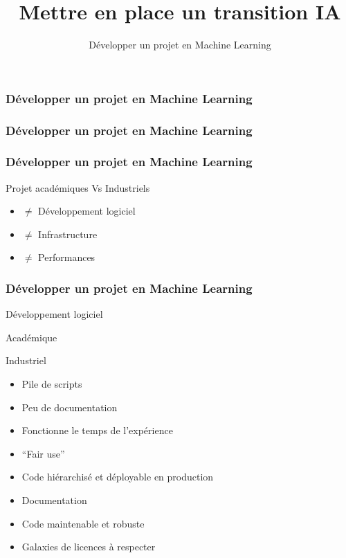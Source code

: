 \documentclass{formation}
\title{Mettre en place un transition IA}
\subtitle{Développer un projet en Machine Learning}
\begin{document}
\maketitle

\begin{frame}
  \frametitle{Développer un projet en Machine Learning}
\end{frame}

\begin{frame}
  \frametitle{Développer un projet en Machine Learning}
\end{frame}

\begin{frame}
  \frametitle{Développer un projet en Machine Learning}
  Projet académiques Vs Industriels
  \begin{itemize}
  \item $\neq$ Développement logiciel
  \item $\neq$ Infrastructure
  \item $\neq$ Performances
  \end{itemize}
\end{frame}

\begin{frame}
  \frametitle{Développer un projet en Machine Learning}
  \begin{center}
    Développement logiciel
  \end{center}
  \begin{minipage}[c]{0.49\linewidth}
    \begin{center}
      Académique
      \newline
    \end{center}
  \end{minipage}\hfill
  \begin{minipage}[c]{0.49\linewidth}
    \begin{center}
      Industriel
      \newline
    \end{center}
  \end{minipage}\hfill
  \begin{minipage}[c]{0.49\linewidth}
    \begin{itemize}
    \item Pile de scripts
    \item Peu de documentation
    \item Fonctionne le temps de l'expérience
      \item ``Fair use''
    \end{itemize}
  \end{minipage}\hfill
  \vrule{}
  \begin{minipage}[c]{0.49\linewidth}
    \begin{itemize}
    \item Code hiérarchisé et déployable en production
    \item Documentation
    \item Code maintenable et robuste
    \item Galaxies de licences à respecter
    \end{itemize}
  \end{minipage}\hfill
\end{frame}
\end{document}
